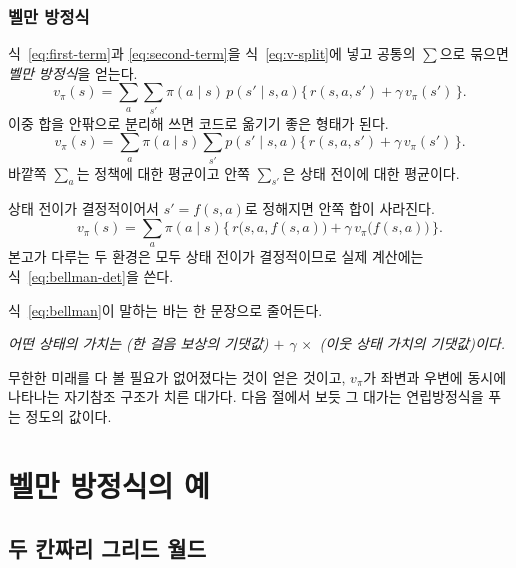 \documentclass[11pt,a4paper]{article}
\begin{document}
\subsubsection{벨만 방정식}

식~\eqref{eq:first-term}과 \eqref{eq:second-term}을 식~\eqref{eq:v-split}에 넣고 공통의 $\sum$으로 묶으면
\emph{벨만 방정식}을 얻는다.
\begin{equation}
  \boxed{\;
  v_\pi(s) = \sum_{a}\sum_{s'} \pi(a\mid s)\,p(s'\mid s,a)
             \bigl\{\, r(s,a,s') + \gamma\, v_\pi(s') \,\bigr\}.
  \;}
  \label{eq:bellman}
\end{equation}
이중 합을 안팎으로 분리해 쓰면 코드로 옮기기 좋은 형태가 된다.
\begin{equation}
  v_\pi(s) = \sum_{a} \pi(a\mid s) \sum_{s'} p(s'\mid s,a)
             \bigl\{\, r(s,a,s') + \gamma\, v_\pi(s') \,\bigr\}.
  \label{eq:bellman-nested}
\end{equation}
바깥쪽 $\sum_a$는 정책에 대한 평균이고 안쪽 $\sum_{s'}$은 상태 전이에 대한 평균이다.

상태 전이가 결정적이어서 $s'=f(s,a)$로 정해지면 안쪽 합이 사라진다.
\begin{equation}
  v_\pi(s) = \sum_{a} \pi(a\mid s)
             \bigl\{\, r\bigl(s,a,f(s,a)\bigr) + \gamma\, v_\pi\bigl(f(s,a)\bigr) \,\bigr\}.
  \label{eq:bellman-det}
\end{equation}
본고가 다루는 두 환경은 모두 상태 전이가 결정적이므로 실제 계산에는 식~\eqref{eq:bellman-det}을 쓴다.

식~\eqref{eq:bellman}이 말하는 바는 한 문장으로 줄어든다.
\begin{center}
\emph{어떤 상태의 가치는 (한 걸음 보상의 기댓값) $+$ $\gamma\,\times$ (이웃 상태 가치의 기댓값)이다.}
\end{center}
무한한 미래를 다 볼 필요가 없어졌다는 것이 얻은 것이고, $v_\pi$가 좌변과 우변에 동시에 나타나는
자기참조 구조가 치른 대가다. 다음 절에서 보듯 그 대가는 연립방정식을 푸는 정도의 값이다.

\section{벨만 방정식의 예}
\label{sec:linear}

\subsection{두 칸짜리 그리드 월드}
\label{sec:two-square}
\end{document}
